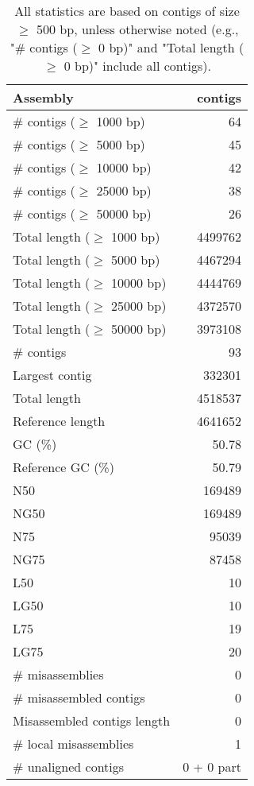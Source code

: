 \documentclass[12pt,a4paper]{article}
\begin{document}
\begin{table}[ht]
\begin{center}
\caption{All statistics are based on contigs of size $\geq$ 500 bp, unless otherwise noted (e.g., "\# contigs ($\geq$ 0 bp)" and "Total length ($\geq$ 0 bp)" include all contigs).}
\begin{tabular}{|l*{1}{|r}|}
\hline
Assembly & contigs \\ \hline
\# contigs ($\geq$ 1000 bp) & 64 \\ \hline
\# contigs ($\geq$ 5000 bp) & 45 \\ \hline
\# contigs ($\geq$ 10000 bp) & 42 \\ \hline
\# contigs ($\geq$ 25000 bp) & 38 \\ \hline
\# contigs ($\geq$ 50000 bp) & 26 \\ \hline
Total length ($\geq$ 1000 bp) & 4499762 \\ \hline
Total length ($\geq$ 5000 bp) & 4467294 \\ \hline
Total length ($\geq$ 10000 bp) & 4444769 \\ \hline
Total length ($\geq$ 25000 bp) & 4372570 \\ \hline
Total length ($\geq$ 50000 bp) & 3973108 \\ \hline
\# contigs & 93 \\ \hline
Largest contig & 332301 \\ \hline
Total length & 4518537 \\ \hline
Reference length & 4641652 \\ \hline
GC (\%) & 50.78 \\ \hline
Reference GC (\%) & 50.79 \\ \hline
N50 & 169489 \\ \hline
NG50 & 169489 \\ \hline
N75 & 95039 \\ \hline
NG75 & 87458 \\ \hline
L50 & 10 \\ \hline
LG50 & 10 \\ \hline
L75 & 19 \\ \hline
LG75 & 20 \\ \hline
\# misassemblies & 0 \\ \hline
\# misassembled contigs & 0 \\ \hline
Misassembled contigs length & 0 \\ \hline
\# local misassemblies & 1 \\ \hline
\# unaligned contigs & 0 + 0 part \\ \hline

\end{tabular}
\end{center}
\end{table}
\end{document}
